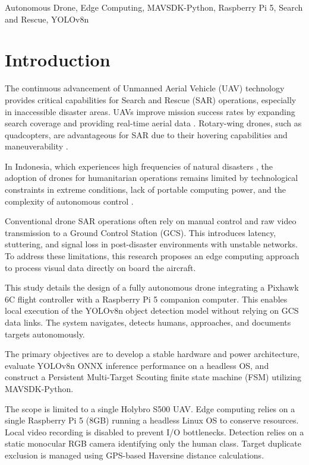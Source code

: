 \documentclass[conference]{IEEEtran}
\begin{document}
	\begin{IEEEkeywords}
		Autonomous Drone, Edge Computing, MAVSDK-Python, Raspberry Pi 5, Search and Rescue, YOLOv8n
	\end{IEEEkeywords}
	
	\section{Introduction}
The continuous advancement of Unmanned Aerial Vehicle (UAV) technology provides critical capabilities for Search and Rescue (SAR) operations, especially in inaccessible disaster areas. UAVs improve mission success rates by expanding search coverage and providing real-time aerial data \cite{b1}. Rotary-wing drones, such as quadcopters, are advantageous for SAR due to their hovering capabilities and maneuverability \cite{b8}.

In Indonesia, which experiences high frequencies of natural disasters \cite{b3}, the adoption of drones for humanitarian operations remains limited by technological constraints in extreme conditions, lack of portable computing power, and the complexity of autonomous control \cite{b4}.

Conventional drone SAR operations often rely on manual control and raw video transmission to a Ground Control Station (GCS). This introduces latency, stuttering, and signal loss in post-disaster environments with unstable networks. To address these limitations, this research proposes an edge computing approach to process visual data directly on board the aircraft.

This study details the design of a fully autonomous drone integrating a Pixhawk 6C flight controller with a Raspberry Pi 5 companion computer. This enables local execution of the YOLOv8n object detection model without relying on GCS data links. The system navigates, detects humans, approaches, and documents targets autonomously.

The primary objectives are to develop a stable hardware and power architecture, evaluate YOLOv8n ONNX inference performance on a headless OS, and construct a Persistent Multi-Target Scouting finite state machine (FSM) utilizing MAVSDK-Python.

The scope is limited to a single Holybro S500 UAV. Edge computing relies on a single Raspberry Pi 5 (8GB) running a headless Linux OS to conserve resources. Local video recording is disabled to prevent I/O bottlenecks. Detection relies on a static monocular RGB camera identifying only the human class. Target duplicate exclusion is managed using GPS-based Haversine distance calculations.
\end{document}
